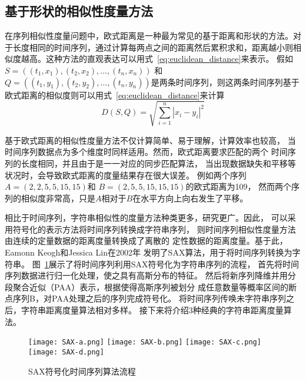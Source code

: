 \subsection{基于形状的相似性度量方法}
在序列相似性度量问题中，欧式距离是一种最为常见的基于距离和形状的方法。对于长度相同的时间序列，通过计算每两点之间的距离然后累积求和，距离越小则相似度越高。这种方法的直观表达可以用式~\ref{eq:euclidean_distance}来表示。
假如$S=\left(\left(t_1,x_1 \right),\left(t_2,x_2\right),\dots,\left(t_n,x_n\right)\right)$
和$Q=\left(\left(t_1,y_1 \right),\left(t_2,y_2\right),\dots,\left(t_n,y_n\right)\right)$是两条时间序列，则这两条时间序列基于欧式距离的相似度则可以用式~\ref{eq:euclidean_distance}来计算
\begin{equation}
  D\left(S,Q\right) = \sqrt{\sum_{i=1}^{n}{\left| x_{i}-y_{i} \right|^{2}}}
  \label{eq:euclidean_distance}
\end{equation}

基于欧式距离的相似性度量方法不仅计算简单、易于理解，计算效率也较高，
当时间序列数据点为多个维度时同样适用。然而，欧式距离要求匹配的两个
时间序列的长度相同，并且由于是一一对应的同步匹配算法，
当出现数据缺失和平移等状况时，会导致欧式距离的度量结果存在很大误差。
例如两个序列$A=\left(2,2,5,5,15,15\right)$和
$B=\left(2,5,5,15,15,15\right)$的欧式距离为109，
然而两个序列的相似度非常高，只是$A$相对于$B$在水平方向上向右发生了平移。

相比于时间序列，字符串相似性的度量方法种类更多，研究更广。因此，
可以采用符号化的表示方法将时间序列转换成字符串序列，
则时间序列相似性度量方法由连续的定量数据的距离度量转换成了离散的
定性数据的距离度量。基于此，Eamonn Keogh和Jessica Lin在2002年
发明了SAX算法，用于将时间序列转换为字符串。
图~\ref{fig:SAX}展示了将时间序列利用SAX符号化为字符串序列的流程，
首先将时间序列数据进行归一化处理，使之具有高斯分布的特征。
然后将新序列降维并用分段聚合近似（PAA）表示，根据使得高斯序列被划分
成任意数量等概率区间的断点序列B，对PAA处理之后的序列完成符号化。
将时间序列传唤未字符串序列之后，字符串距离度量算法相对多样。
接下来将介绍3种经典的字符串距离度量算法。
\begin{figure}
  \centering
    {\texttt{[image: SAX-a.png]}}
    {\texttt{[image: SAX-b.png]}}
    {\texttt{[image: SAX-c.png]}}
    {\texttt{[image: SAX-d.png]}}
  \caption{SAX符号化时间序列算法流程}
  \label{fig:SAX}
\end{figure}

